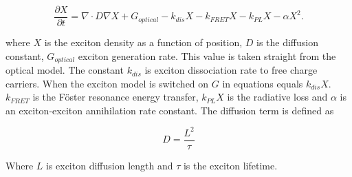\begin{equation}
\label{eq:exciton}
\frac{\partial X}{\partial t} = \nabla \cdot D \nabla X +G_{optical} -k_{dis} X -k_{FRET} X- k_{PL} X-\alpha X^2.
\end{equation}

where $X$ is the exciton density as a function of position, $D$ is the diffusion constant, $G_{optical}$ exciton generation rate. This value is taken straight from the optical model.  The constant $k_{dis}$ is exciton dissociation rate to free charge carriers.  When the exciton model is switched on $G$ in equations equals $k_{dis} X$. $k_{FRET}$ is the F\"{o}ster resonance energy transfer, $k_{PL} X$ is the radiative loss and $\alpha$ is an exciton-exciton annihilation rate constant.  The diffusion term is defined as 

\begin{equation}
\label{eq:exciton}
D=\frac{L^2}{\tau}
\end{equation}

Where $L$ is exciton diffusion length and $\tau$ is the exciton lifetime.

